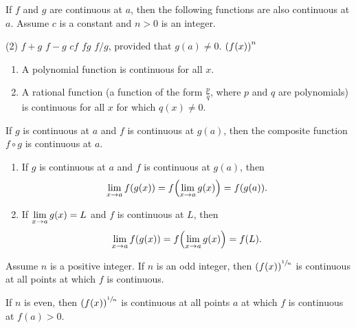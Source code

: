 \documentclass[../mathNotesPreamble]{subfiles}
\begin{document}
  \pagebreak

  \begin{thmBox*}
    If $f$ and $g$ are continuous at $a$, then the following functions are also continuous at $a$. Assume $c$ is a constant and $n>0$ is an integer.
    \begin{tasks}(2)
      \task $f+g$
      \task $f-g$
      \task $cf$
      \task $fg$
      \task $f/g$, provided that $g(a)\neq 0$.
      \task ${\left(f(x)\right)}^n$
    \end{tasks}
  \end{thmBox*}

  \begin{thmBox*}
    \begin{enumerate}[label=\alph*)]
      \item A polynomial function is continuous for all $x$.
      \item A rational function (a function of the form $\frac{p}{q}$, where $p$ and $q$ are polynomials) is continuous for all $x$ for which $q(x)\neq 0$.
    \end{enumerate}
  \end{thmBox*}

  \begin{thmBox*}
    If $g$ is continuous at $a$ and $f$ is continuous at $g(a)$, then the composite function $f\circ g$ is continuous at $a$.
  \end{thmBox*}

  \begin{thmBox*}
    \begin{enumerate}
      \item If $g$ is continuous at $a$ and $f$ is continuous at $g(a)$, then
        $$\lim_{x \to a} f{\left(g(x)\right)}=f{\left(\lim_{x \to a} g(x)\right)}=f{\left(g(a)\right)}.$$
      \item If $\displaystyle\lim_{x \to a} g(x)=L$ and $f$ is continuous at $L$, then
        $$\lim_{x \to a} f{\left(g(x)\right)}=f{\left(\lim_{x \to a}g(x)\right)}=f{\left(L\right)}.$$
    \end{enumerate}
  \end{thmBox*}
  \pagebreak

  \begin{thmBox*}
    Assume $n$ is a positive integer. If $n$ is an odd integer, then ${\left(f(x)\right)}^{\sfrac{1}{n}}$ is continuous at all points at which $f$ is continuous.

    If $n$ is even, then ${\left(f(x)\right)}^{\sfrac{1}{n}}$ is continuous at all points $a$ at which $f$ is continuous at $f(a)>0$.
  \end{thmBox*}
  \vspace*{15pt}
\end{document}
